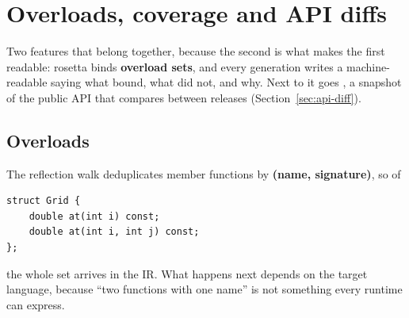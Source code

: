 \chapter{Overloads, coverage and API diffs}
\label{ch:coverage}

Two features that belong together, because the second is what makes the first
readable: rosetta binds \textbf{overload sets}, and every generation writes a
machine-readable  saying what bound, what did not, and why.
Next to it goes , a snapshot of the public API that
 compares between releases
(Section~\ref{sec:api-diff}).

\section{Overloads}

The reflection walk deduplicates member functions by \textbf{(name,
signature)}, so of

\begin{lstlisting}[style=cpp]
struct Grid {
    double at(int i) const;
    double at(int i, int j) const;
};
\end{lstlisting}

the whole set arrives in the IR. What happens next depends on the target
language, because ``two functions with one name'' is not something every runtime
can express.

